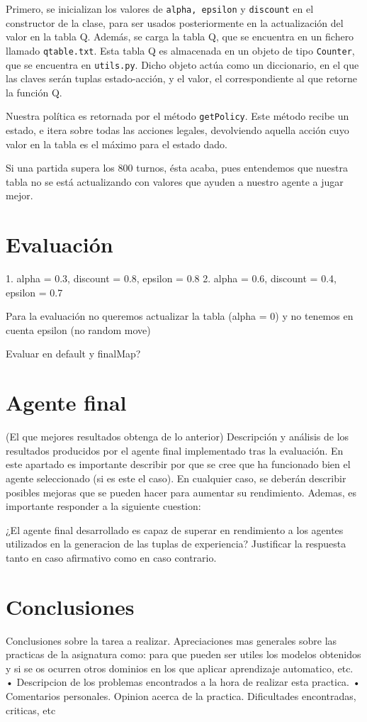 \documentclass[12pt]{article}
\begin{document}
Primero, se inicializan los valores de \texttt{alpha, epsilon} y \texttt{discount} en el constructor de la clase, para ser usados posteriormente en la actualización del valor en la tabla Q. Además, se carga la tabla Q, que se encuentra en un fichero llamado \texttt{qtable.txt}. Esta tabla Q es almacenada en un objeto de tipo \texttt{Counter}, que se encuentra en \texttt{utils.py}. Dicho objeto actúa como un diccionario, en el que las claves serán tuplas estado-acción, y el valor, el correspondiente al que retorne la función Q.

Nuestra política es retornada por el método \texttt{getPolicy}. Este método recibe un estado, e itera sobre todas las acciones legales, devolviendo aquella acción cuyo valor en la tabla es el máximo para el estado dado.

Si una partida supera los 800 turnos, ésta acaba, pues entendemos que nuestra tabla no se está actualizando con valores que ayuden a nuestro agente a jugar mejor.

\section{Evaluación}
1. alpha = 0.3, discount = 0.8, epsilon = 0.8
2. alpha = 0.6, discount = 0.4, epsilon = 0.7

Para la evaluación no queremos actualizar la tabla (alpha = 0) y no tenemos en cuenta epsilon (no random move)



Evaluar en default y finalMap?

\section{Agente final}
(El que mejores resultados obtenga de lo anterior)
Descripción y análisis de los resultados producidos por el agente final implementado tras la evaluación. En este apartado es importante describir por que se cree que ha funcionado bien el agente seleccionado (si es este el caso). En cualquier caso, se deberán describir posibles mejoras que se pueden hacer para aumentar su rendimiento. Ademas, es importante responder a la siguiente cuestion:
        
¿El agente final desarrollado es capaz de superar en rendimiento a los agentes utilizados en la generacion de las tuplas de experiencia? Justificar la respuesta tanto en caso afirmativo como en caso contrario.


\section{Conclusiones}
Conclusiones sobre la tarea a realizar.
Apreciaciones mas generales sobre las practicas de la asignatura como: para que pueden ser utiles los modelos obtenidos y si se os ocurren otros dominios en los que aplicar aprendizaje automatico, etc.
• Descripcion de los problemas encontrados a la hora de realizar esta practica.
• Comentarios personales. Opinion acerca de la practica. Dificultades encontradas, criticas, etc
\end{document}
